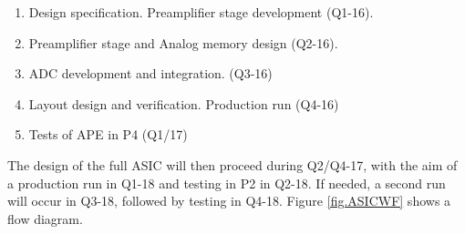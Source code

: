 \begin{enumerate}
\item Design specification. Preamplifier stage development (Q1-16).
\item Preamplifier stage and Analog memory design (Q2-16).
\item ADC development and integration. (Q3-16)
\item Layout design and verification. Production run (Q4-16)
\item Tests of APE in P4 (Q1/17)
\end{enumerate}
 
 The design of the full ASIC will then proceed during Q2/Q4-17, with the aim of a production run in Q1-18 and testing in P2 in Q2-18. If needed, a second run will occur in Q3-18, followed by testing in Q4-18. Figure \ref{fig.ASICWF} shows a flow diagram. 
